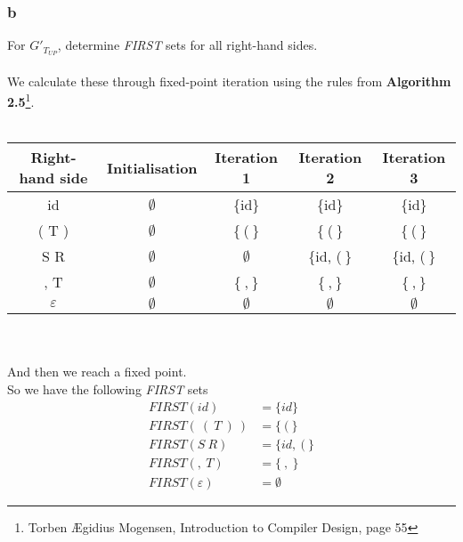 \documentclass[12pt]{article}
\begin{document}
\subsubsection{b}
For $G'_{T_{UP}}$, determine \textit{FIRST} sets for all right-hand sides.\\
\\
We calculate these through fixed-point iteration using the rules from \textbf{Algorithm 2.5}\footnote{Torben Ægidius Mogensen, Introduction to Compiler Design, page 55}.  \\
\\
\begin{tabular}{c|c|c|c|c}
\hline 
Right-hand side & Initialisation & Iteration 1 & Iteration 2 & Iteration 3 \\ 
\hline 
id & $\emptyset$ & \{id\} & \{id\} & \{id\} \\ 
( T ) & $\emptyset$ & \{$\:$($\:$\} & \{$\:$($\:$\} & \{$\:$($\:$\} \\ 
S R & $\emptyset$ & $\emptyset$ & \{id, ($\:$\} & \{id, ($\:$\} \\ 
, T & $\emptyset$ & \{$\:$,$\:$\} & \{$\:$,$\:$\} & \{$\:$,$\:$\} \\  
$\varepsilon$ & $\emptyset$ & $\emptyset$ & $\emptyset$ & $\emptyset$ \\ 
\hline
\end{tabular} \\
\\
And then we reach a fixed point.\\
So we have the following \textit{FIRST} sets
\begin{align*}
FIRST(id) &=\{id\} \\
FIRST(\:(\:T\:)\:) &= \{\:(\:\} \\
FIRST(S\:R) &= \{id,\:(\:\} \\
FIRST(,\:T) &= \{\:,\:\} \\
FIRST(\varepsilon) &= \emptyset
\end{align*}
\end{document}
